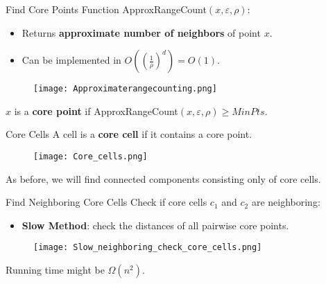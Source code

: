 \documentclass[aspectratio=169]{beamer}
\renewcommand{\epsilon}{\varepsilon}
\begin{document}
\begin{frame}{Find Core Points}
    Function ApproxRangeCount$(x,\epsilon,\rho)$:
    
\vspace{0.3cm}
    \begin{minipage}{0.55\textwidth}
    \begin{itemize}
        \item Returns \textbf{approximate number of neighbors} of point $x$.
        \item Can be implemented in $O\left(\left(\frac{1}{\rho}\right)^d\right)=O(1)$.
    \end{itemize}
        
    \end{minipage}
    \hfill
    \begin{minipage}{0.4\textwidth}
        \begin{figure}
            \centering
            \texttt{[image: Approximaterangecounting.png]}
        \end{figure}
    \end{minipage}
    
    
\vspace{0.3cm}

        \centering $x$ is a \textbf{core point} if ApproxRangeCount$(x,\epsilon,\rho)\ge MinPts$.
\end{frame}

\begin{frame}{Core Cells}
    A cell is a \textbf{core cell} if it contains a core point.
    
    \vspace{0.3cm}
    
    \begin{figure}
        \centering
        \texttt{[image: Core\_cells.png]}
    \end{figure}

    As before, we will find connected components consisting only of core cells.
\end{frame}

\begin{frame}{Find Neighboring Core Cells}
    Check if core cells $c_1$ and $c_2$ are neighboring:
    \begin{itemize}
        \item \textbf{Slow Method}: check the distances of all pairwise core points.
    \end{itemize}

    \begin{figure}
        \centering
        \texttt{[image: Slow\_neighboring\_check\_core\_cells.png]}
    \end{figure}
    
    Running time might be $\Omega(n^2)$.
    
\end{frame}
\end{document}
